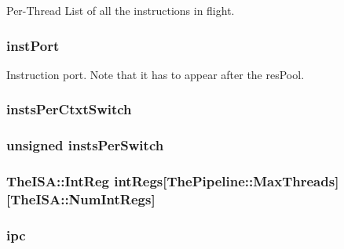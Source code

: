 \label{classInOrderCPU_a407a202e9777af8f3aca683ff7257693}
Per-\/Thread List of all the instructions in flight. \hypertarget{classInOrderCPU_a170c2f44ce8ed65aee6cf1da2a0e6296}{
\subsubsection[{instPort}]{ {\bf instPort}}}
\label{classInOrderCPU_a170c2f44ce8ed65aee6cf1da2a0e6296}
Instruction port. Note that it has to appear after the resPool. \hypertarget{classInOrderCPU_a057e08ddcb9e612ce7e273a324fd2a31}{
\subsubsection[{instsPerCtxtSwitch}]{ {\bf instsPerCtxtSwitch}}}
\label{classInOrderCPU_a057e08ddcb9e612ce7e273a324fd2a31}
\hypertarget{classInOrderCPU_aa5fa9dd1c64f901b65487ef9c44ba4c1}{
\subsubsection[{instsPerSwitch}]{\setlength{\rightskip}{0pt plus 5cm}unsigned {\bf instsPerSwitch}}}
\label{classInOrderCPU_aa5fa9dd1c64f901b65487ef9c44ba4c1}
\hypertarget{classInOrderCPU_a66f502f952354c9e141e6de6fd8c1d17}{
\subsubsection[{intRegs}]{\setlength{\rightskip}{0pt plus 5cm}TheISA::IntReg {\bf intRegs}\mbox{[}{\bf ThePipeline::MaxThreads}\mbox{]}\mbox{[}TheISA::NumIntRegs\mbox{]}}}
\label{classInOrderCPU_a66f502f952354c9e141e6de6fd8c1d17}
\hypertarget{classInOrderCPU_a6f168a31ee4084b6167d6761a4124014}{
\subsubsection[{ipc}]{ {\bf ipc}}}
